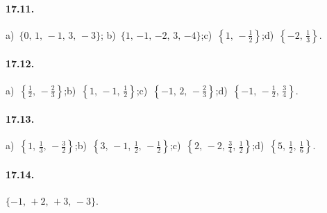 \paragraph{17.11.}
a)~$\{0\text{,~}1\text{,~}-1\text{,~}3\text{,~}-3\}$;\quad
b)~$\{1\text{,~}{-1}\text{,~}{-2}\text{,~}3\text{,~}{-4}\}$;\quad c)~$\left\{1\text{,~}-\frac{1}{2}\right\}$;\quad d)~$\left\{-2\text{,~}\frac{1}{3}\right\}$.

\paragraph{17.12.}
a)~$\left\{\frac{1}{2}\text{,~}-\frac{2}{3}\right\}$;\quad b)~$\left\{1\text{,~}-1\text{,~}\frac{1}{2}\right\}$;\quad c)~$\left\{-1\text{,~}2\text{,~}-\frac{2}{3}\right\}$;\quad d)~$\left\{-1\text{,~}-\frac{1}{2}\text{,~}\frac{3}{4}\right\}$.

\paragraph{17.13.}
a)~$\left\{1\text{,~}\frac{1}{3}\text{,~}-\frac{3}{2}\right\}$;\quad b)~$\left\{3\text{,~}-1\text{,~}\frac{1}{2}\text{,~}-\frac{1}{2}\right\}$;\quad c)~$\left\{2\text{,~}-2\text{,~}\frac{3}{4}\text{,~}\frac{1}{2}\right\}$;\quad d)~$\left\{5\text{,~}\frac{1}{2}\text{,~}\frac{1}{6}\right\}$.

\paragraph{17.14.}
$\{-1\text{,~}+2\text{,~}+3\text{,~}-3\}$.
